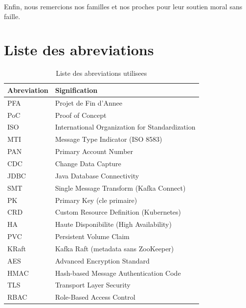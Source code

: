 Enfin, nous remercions nos familles et nos proches pour leur soutien moral sans faille.

\newpage

\tableofcontents
\newpage

\listoffigures
{}
\newpage

\listoftables
{}
\newpage

\chapter*{Liste des abreviations}

\begin{table}[H]
\centering
\renewcommand{\arraystretch}{1.3}
\begin{tabularx}{\textwidth}{@{} l X @{}}
\toprule
\textbf{Abreviation} & \textbf{Signification} \\
\midrule
PFA & Projet de Fin d'Annee \\
\rowcolor{gray!6} PoC & Proof of Concept \\
ISO & International Organization for Standardization \\
\rowcolor{gray!6} MTI & Message Type Indicator (ISO 8583) \\
PAN & Primary Account Number \\
\rowcolor{gray!6} CDC & Change Data Capture \\
JDBC & Java Database Connectivity \\
\rowcolor{gray!6} SMT & Single Message Transform (Kafka Connect) \\
PK & Primary Key (cle primaire) \\
\rowcolor{gray!6} CRD & Custom Resource Definition (Kubernetes) \\
HA & Haute Disponibilite (High Availability) \\
\rowcolor{gray!6} PVC & Persistent Volume Claim \\
KRaft & Kafka Raft (metadata sans ZooKeeper) \\
\rowcolor{gray!6} AES & Advanced Encryption Standard \\
HMAC & Hash-based Message Authentication Code \\
\rowcolor{gray!6} TLS & Transport Layer Security \\
RBAC & Role-Based Access Control \\
\bottomrule
\end{tabularx}
\caption{Liste des abreviations utilisees}
\label{tab:abreviations}
\end{table}

